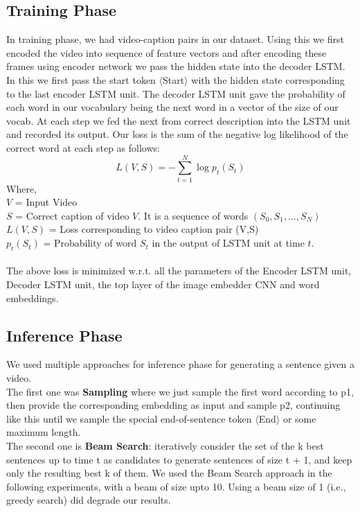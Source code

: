 \documentclass[12pt]{article}
\begin{document}
\subsection{Training Phase}
In training phase, we had video-caption pairs in our dataset. Using this we first encoded the video into sequence of feature
vectors and after encoding these frames using encoder network we pass the hidden state into the decoder LSTM. In this we first
pass the start token $\langle$Start$\rangle$ with the hidden state corresponding to the last encoder LSTM unit. The 
decoder LSTM unit gave the probability of each word in our vocabulary being the next word in a vector of the size 
of our vocab. At each step we fed the next from correct description into the LSTM unit and recorded its output.
Our loss is the sum of the negative log likelihood of the correct word at each step as follows:
$$
	L(V,S) = - \sum_{t=1}^{N}{\log{p_t(S_t)}}
$$
Where,\\
$V$ = Input Video\\
$S$ = Correct caption of video $V$. It is a sequence of words $(S_0,S_1,\ldots,S_N)$\\
$L(V,S)$ = Loss corresponding to video caption pair (V,S)\\
$p_t(S_t)$ = Probability of word $S_t$ in the output of LSTM unit at time $t$.\\\\
The above loss is minimized w.r.t. all the parameters of the Encoder LSTM unit, Decoder LSTM unit,
the top layer of the image embedder CNN and word embeddings.

\subsection{Inference Phase}
We used multiple approaches for inference phase for generating a sentence given a video.
\\The first one was \textbf{Sampling} where we just sample the first word according to p1, then provide the corresponding embedding
as input and sample p2, continuing like this until we sample
the special end-of-sentence token $\langle$End$\rangle$ or some maximum length.
\\The second one is \textbf{Beam Search}: iteratively consider the set of the k best sentences up to time t as candidates to generate
sentences of size t + 1, and keep only the resulting best k
of them.
We used the Beam Search approach in the following experiments,
with a beam of size upto 10. Using a beam size of 1 (i.e.,
greedy search) did degrade our results.
\end{document}

